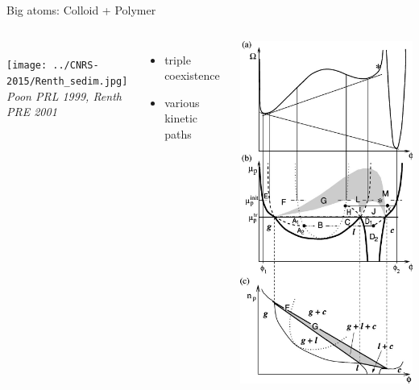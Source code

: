 \documentclass[xcolor=table]{beamer}
\begin{document}
\begin{frame}{Big atoms: Colloid + Polymer}
\begin{columns}
\\

	\bigskip
	\texttt{[image: ../CNRS-2015/Renth\_sedim.jpg]}\\
	\textit{\footnotesize Poon PRL 1999, Renth PRE 2001}
	\begin{itemize}
	\item triple coexistence
	\item various kinetic paths
	\end{itemize}

	\includegraphics[width=\textwidth,clip=true,trim=0 0 0 4.5cm]{presentation/Renth_diag.pdf}
	\end{columns}
\end{frame}
\end{document}
